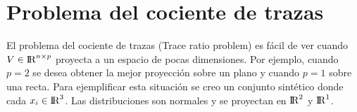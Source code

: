 




\section{Problema del cociente de trazas}

El problema del cociente de trazas (Trace ratio problem) es fácil de ver cuando $V \in {\rm I\!R}^{n \times p}$ proyecta a un espacio de pocas dimensiones. Por ejemplo, cuando $p = 2$ se desea obtener la mejor proyección sobre un plano y cuando $p = 1$ sobre una recta. Para ejemplificar esta situación se creo un conjunto sintético donde cada $x_i \in {\rm I\!R}^{3}$. Las distribuciones son normales y se proyectan en ${\rm I\!R}^{2}$ y ${\rm I\!R}^{1}$.

